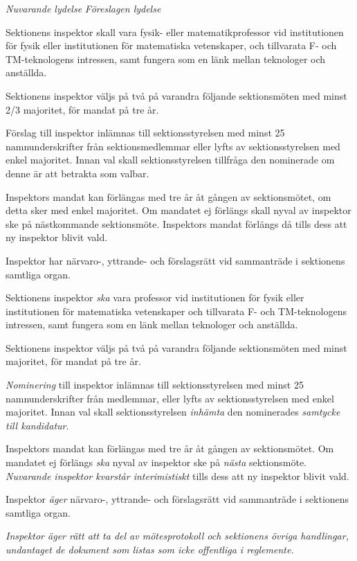 \documentclass{article}
\newenvironment{lydelse}
    {\begin{paracol}{2}%
        \emph{Nuvarande lydelse}%
        \switchcolumn%
        \emph{Föreslagen lydelse}%
    \end{paracol}%
    \begin{enumerate}[label=\thesubsection.\arabic*]%
    \begin{paracol}{2}%
    }{\end{paracol}\end{enumerate}}
\newcommand{\itemb}{\item[\textbullet]}
\begin{document}
\begin{lydelse}
    \itemb Sektionens inspektor skall vara fysik- eller matematikprofessor vid institutionen för fysik eller institutionen för matematiska vetenskaper, och tillvarata F- och TM-teknologens intressen, samt fungera som en länk mellan teknologer och anställda.
	
	\itemb Sektionens inspektor väljs på två på varandra följande sektionsmöten med minst 2/3 majoritet, för mandat på tre år. 
	
	\itemb Förslag till inspektor inlämnas till sektionsstyrelsen med minst 25 namnunderskrifter från sektionsmedlemmar eller lyfts av sektionsstyrelsen med enkel majoritet. Innan val skall sektionsstyrelsen tillfråga den nominerade om denne är att betrakta som valbar.
	
    \itemb Inspektors mandat kan förlängas med tre år åt gången av sektionsmötet, om detta sker med enkel majoritet. Om mandatet ej förlängs skall nyval av inspektor ske på nästkommande sektionsmöte. Inspektors mandat förlängs då tills dess att ny inspektor blivit vald.

    \itemb Inspektor har närvaro-, yttrande- och förslagsrätt vid sammanträde i sektionens samtliga organ.
    
  \switchcolumn
  \setcounter{enumi}{0}
    
    \item Sektionens inspektor \emph{ska} vara professor vid institutionen för fysik eller institutionen för matematiska vetenskaper och tillvarata F- och TM-teknologens intressen, samt fungera som en länk mellan teknologer och anställda.
	
	\item Sektionens inspektor väljs på två på varandra följande sektionsmöten med minst  majoritet, för mandat på tre år. \label{maj:in} 
	
	\item \emph{Nominering} till inspektor inlämnas till sektionsstyrelsen med minst 25 namnunderskrifter från medlemmar, eller lyfts av sektionsstyrelsen med enkel majoritet.
    Innan val skall sektionsstyrelsen \emph{inhämta} den nominerades \emph{samtycke till kandidatur}.
	
	\item Inspektors mandat kan förlängas med tre år åt gången av sektionsmötet.
    Om mandatet ej förlängs \emph{ska} nyval av inspektor ske på \emph{nästa} sektionsmöte.
	\emph{Nuvarande inspektor kvarstår interimistiskt} tills dess att ny inspektor blivit vald.

    \item Inspektor \emph{äger} närvaro-, yttrande- och förslagsrätt vid sammanträde i sektionens samtliga organ.
    
    \item \emph{Inspektor äger rätt att ta del av mötesprotokoll och sektionens övriga handlingar, undantaget de dokument som listas som icke offentliga i reglemente.}
\end{lydelse}
\end{document}
